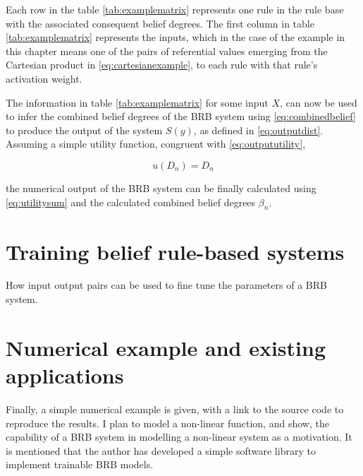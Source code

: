 Each row in the table \ref{tab:examplematrix} represents one 
rule in the rule base with the associated consequent belief degrees.
The first column in table \ref{tab:examplematrix} represents the inputs, which in the case of the example in this chapter means one of the pairs
of referential values emerging from the Cartesian product in \eqref{eq:cartesianexample}, to each rule with that rule's activation weight.

The information in table \ref{tab:examplematrix} for some input $X$, can now be used to infer the combined belief degrees of the BRB system using
\eqref{eq:combinedbelief} to produce the output of the system $S(y)$, as defined in \eqref{eq:outputdist}. Assuming a simple utility function, congruent
with \eqref{eq:outpututility},

\begin{equation}
    u(D_n) = D_n
\end{equation}

the numerical output of the BRB system can be finally calculated using \eqref{eq:utilitysum} and the calculated combined belief degrees $\beta_n$.


\section{Training belief rule-based systems}
\label{training}
{\color{red}
How input output pairs can be used to fine tune the parameters of a BRB system.
}

\section{Numerical example and existing applications}
\label{numerical}
{\color{red}
Finally, a simple numerical example is given, with a link to the source code to reproduce the results. I plan to model a non-linear function, and show,
the capability of a BRB system in modelling a non-linear system as a motivation. It is mentioned that the author has developed a simple software library to implement
trainable BRB models.
}